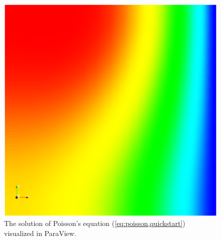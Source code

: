 \begin{figure}[htbp]
  \begin{center}
    \includegraphics[width=12cm]{eps/poisson.eps}
    \caption{The solution of Poisson's equation (\ref{eq:poisson,quickstart})
      visualized in ParaView.}
  \end{center}
\end{figure}
